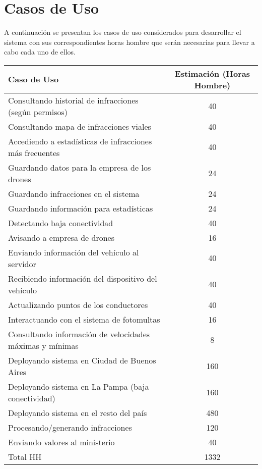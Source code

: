 \section{Casos de Uso}

A continuación se presentan los casos de uso considerados para desarrollar el sistema
con sus correspondientes horas hombre que serán necesarias para llevar a cabo 
cada uno de ellos.


\begin{table}[htb]
\begin{center}
\begin{tabular}{|l|c|}
\hline
Caso de Uso & Estimación (Horas Hombre) \\
\hline \hline
Consultando historial de infracciones (según permisos) & 40 \\ \hline
Consultando mapa de infracciones viales & 40 \\ \hline
Accediendo a estadísticas de infracciones más frecuentes & 40 \\ \hline
Guardando datos para la empresa de los drones & 24 \\ \hline
Guardando infracciones en el sistema & 24 \\ \hline
Guardando información para estadísticas & 24 \\ \hline
Detectando baja conectividad & 40 \\ \hline
Avisando a empresa de drones & 16 \\ \hline
Enviando información del vehículo al servidor & 40 \\ \hline
Recibiendo información del dispositivo del vehículo & 40 \\ \hline
Actualizando puntos de los conductores & 40 \\ \hline
Interactuando con el sistema de fotomultas & 16 \\ \hline
Consultando información de velocidades máximas y mínimas & 8 \\ \hline
Deployando sistema en Ciudad de Buenos Aires & 160 \\ \hline
Deployando sistema en La Pampa (baja conectividad) & 160 \\ \hline
Deployando sistema en el resto del país & 480 \\ \hline
Procesando/generando infracciones & 120 \\ \hline
Enviando valores al ministerio & 40 \\ \hline
Total HH & 1332 \\ \hline
\end{tabular}
\label{tabla:sencilla}
\end{center}
\end{table}
